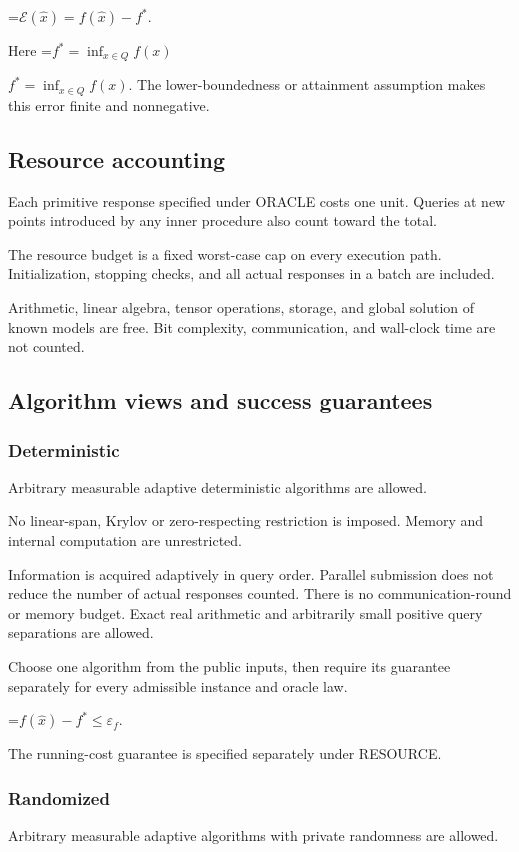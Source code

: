\documentclass[10pt,a4paper]{article}
\newcommand{\AtlasMath}[1]{\par\begingroup\centering\setbox0=\hbox{$\displaystyle #1$}\ifdim\wd0>1.4\linewidth\typeout{ATLAS WIDE FORMULA: \the\wd0}\fi\ifdim\wd0>\linewidth\resizebox{\linewidth}{!}{\box0}\else\box0\fi\par\endgroup}
\newcommand{\AtlasInlineMath}[1]{\begingroup\setbox0=\hbox{$#1$}\ifdim\wd0>.4\linewidth\endgroup\AtlasMath{#1}\else\endgroup$#1$\fi}
\begin{document}
\AtlasMath{\mathcal{E}(\widehat{x})=f(\widehat{x})-f^*.}


Here \AtlasInlineMath{f^*=\inf_{x\in Q}f(x)}. The lower-boundedness or attainment assumption makes this error finite and nonnegative.

\subsection{Resource accounting}
Each primitive response specified under ORACLE costs one unit. Queries at new points introduced by any inner procedure also count toward the total.

The resource budget is a fixed worst-case cap on every execution path. Initialization, stopping checks, and all actual responses in a batch are included.

Arithmetic, linear algebra, tensor operations, storage, and global solution of known models are free. Bit complexity, communication, and wall-clock time are not counted.

\subsection{Algorithm views and success guarantees}
\subsubsection{Deterministic}
Arbitrary measurable adaptive deterministic algorithms are allowed.

No linear-span, Krylov or zero-respecting restriction is imposed. Memory and internal computation are unrestricted.

Information is acquired adaptively in query order. Parallel submission does not reduce the number of actual responses counted. There is no communication-round or memory budget. Exact real arithmetic and arbitrarily small positive query separations are allowed.

Choose one algorithm from the public inputs, then require its guarantee separately for every admissible instance and oracle law.


\AtlasMath{f(\widehat{x})-f^*\le \varepsilon_f.}


The running-cost guarantee is specified separately under RESOURCE.

\subsubsection{Randomized}
Arbitrary measurable adaptive algorithms with private randomness are allowed.
\end{document}
